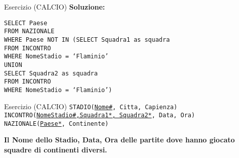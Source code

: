 \begin{frame}{Esercizio (CALCIO)}
    \textbf{Soluzione:}
    \vspace{1em}
    
    \texttt{SELECT Paese\\FROM NAZIONALE\\WHERE Paese NOT IN (SELECT Squadra1 as squadra \\\hspace{10em}FROM INCONTRO \\\hspace{10em}WHERE NomeStadio = `Flaminio'
\\\hspace{10em}UNION\\\hspace{10em}SELECT Squadra2 as squadra \\\hspace{10em}FROM INCONTRO \\\hspace{10em}WHERE NomeStadio = `Flaminio')}
\end{frame}
\begin{frame}{Esercizio (CALCIO) } 
    \texttt{STADIO(\underline{Nome\#}, Citta, Capienza)\\
    INCONTRO(\underline{NomeStadio\#,Squadra1*, Squadra2*}, Data, Ora)\\
    NAZIONALE(\underline{Paese*}, Continente)}
    \vspace{1em}
    
    \textbf{Il Nome dello Stadio, Data, Ora delle partite dove hanno giocato squadre di continenti diversi.}
\end{frame}

